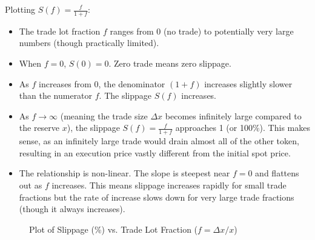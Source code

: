 \documentclass[12pt]{article}
\begin{document}
Plotting $S(f) = \frac{f}{1 + f}$:
\begin{itemize}
    \item The trade lot fraction $f$ ranges from 0 (no trade) to potentially very large numbers (though practically limited).
    \item When $f = 0$, $S(0) = 0$. Zero trade means zero slippage.
    \item As $f$ increases from 0, the denominator $(1+f)$ increases slightly slower than the numerator $f$. The slippage $S(f)$ increases.
    \item As $f \to \infty$ (meaning the trade size $\Delta x$ becomes infinitely large compared to the reserve $x$), the slippage $S(f) = \frac{f}{1+f}$ approaches 1 (or 100\%). This makes sense, as an infinitely large trade would drain almost all of the other token, resulting in an execution price vastly different from the initial spot price.
    \item The relationship is non-linear. The slope is steepest near $f=0$ and flattens out as $f$ increases. This means slippage increases rapidly for small trade fractions but the rate of increase slows down for very large trade fractions (though it always increases).
\end{itemize}

\begin{figure}[H]
    \centering
    \caption{Plot of Slippage (\%) vs. Trade Lot Fraction ($f = \Delta x / x$)}
    \label{fig:slippage_fraction}
\end{figure}
\end{document}
